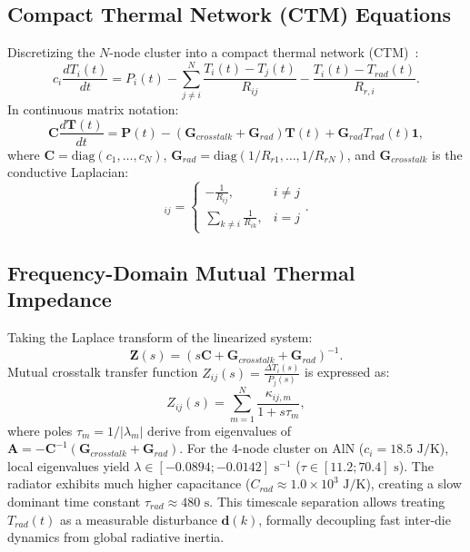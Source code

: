 \documentclass[journal]{IEEEtran}
\begin{document}
\subsection{Compact Thermal Network (CTM) Equations}
Discretizing the $N$-node cluster into a compact thermal network (CTM)~\cite{skadron2004hotspot, wang2025packaging, chen2026hotai, nasa2022handbook}:
\begin{equation}
c_i \frac{d T_i(t)}{dt} = P_i(t) - \sum_{j \ne i}^N \frac{T_i(t) - T_j(t)}{R_{ij}} - \frac{T_i(t) - T_{rad}(t)}{R_{r, i}}.
\end{equation}
In continuous matrix notation:
\begin{equation}
\mathbf{C} \frac{d\mathbf{T}(t)}{dt} = \mathbf{P}(t) - \left( \mathbf{G}_{crosstalk} + \mathbf{G}_{rad} \right) \mathbf{T}(t) + \mathbf{G}_{rad} T_{rad}(t) \mathbf{1},
\end{equation}
where $\mathbf{C} = \text{diag}(c_1, \dots, c_N)$, $\mathbf{G}_{rad} = \text{diag}(1/R_{r1}, \dots, 1/R_{rN})$, and $\mathbf{G}_{crosstalk}$ is the conductive Laplacian:
\begin{equation}
[\mathbf{G}_{crosstalk}]_{ij} = \begin{cases} - \frac{1}{R_{ij}}, & i \ne j \\ \sum_{k \ne i} \frac{1}{R_{ik}}, & i = j \end{cases}.
\end{equation}

\subsection{Frequency-Domain Mutual Thermal Impedance}
Taking the Laplace transform of the linearized system:
\begin{equation}
\mathbf{Z}(s) = \left( s \mathbf{C} + \mathbf{G}_{crosstalk} + \mathbf{G}_{rad} \right)^{-1}.
\end{equation}
Mutual crosstalk transfer function $Z_{ij}(s) = \frac{\Delta T_i(s)}{P_j(s)}$ is expressed as:
\begin{equation}
Z_{ij}(s) = \sum_{m=1}^{N} \frac{\kappa_{ij, m}}{1 + s \tau_m},
\end{equation}
where poles $\tau_m = 1/|\lambda_m|$ derive from eigenvalues of $\mathbf{A} = -\mathbf{C}^{-1}(\mathbf{G}_{crosstalk} + \mathbf{G}_{rad})$. For the 4-node cluster on AlN ($c_i = 18.5\text{ J/K}$), local eigenvalues yield $\lambda \in [-0.0894; -0.0142]\text{ s}^{-1}$ ($\tau \in [11.2; 70.4]\text{ s}$). The radiator exhibits much higher capacitance ($C_{rad} \approx 1.0 \times 10^3\text{ J/K}$), creating a slow dominant time constant $\tau_{rad} \approx 480\text{ s}$. This timescale separation allows treating $T_{rad}(t)$ as a measurable disturbance $\mathbf{d}(k)$, formally decoupling fast inter-die dynamics from global radiative inertia.
\end{document}
